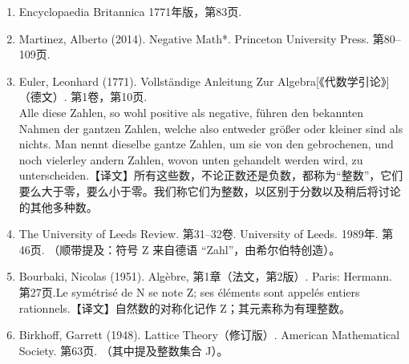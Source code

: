 \begin{enumerate}
\item Encyclopaedia Britannica 1771年版，第83页.
\item Martinez, Alberto (2014). Negative Math*. Princeton University Press. 第80–109页.
\item Euler, Leonhard (1771). Vollständige Anleitung Zur Algebra[《代数学引论》]（德文）. 第1卷，第10页.\\
Alle diese Zahlen, so wohl positive als negative, führen den bekannten Nahmen der gantzen Zahlen, welche also entweder größer oder kleiner sind als nichts. Man nennt dieselbe gantze Zahlen, um sie von den gebrochenen, und noch vielerley andern Zahlen, wovon unten gehandelt werden wird, zu unterscheiden.【译文】所有这些数，不论正数还是负数，都称为“整数”，它们要么大于零，要么小于零。我们称它们为整数，以区别于分数以及稍后将讨论的其他多种数。
\item The University of Leeds Review. 第31–32卷. University of Leeds. 1989年. 第46页. （顺带提及：符号 Z 来自德语 “Zahl”，由希尔伯特创造）。
\item Bourbaki, Nicolas (1951). Algèbre, 第1章（法文，第2版）. Paris: Hermann. 第27页.Le symétrisé de N se note Z; ses éléments sont appelés entiers rationnels.【译文】自然数的对称化记作 Z；其元素称为有理整数。
\item Birkhoff, Garrett (1948). Lattice Theory（修订版）. American Mathematical Society. 第63页. （其中提及整数集合 J）。
\end{enumerate}
